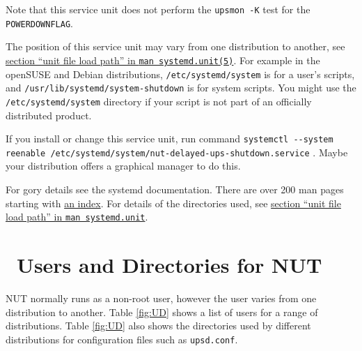 \documentclass[12pt]{article}
\newlength{\headersep}\setlength{\headersep}{3mm}
\newcommand{\Hsep}{\hspace{\headersep}}
\newcommand{\newcolumn}{\vfill\eject}
\newcommand{\upsdconf}{\textcolor{UPSDCOLOUR}{\texttt{upsd.conf}}}
\newcommand{\LINman}[2]{\href{https://man7.org/linux/man-pages/man#2/#1.#2.html}{\texttt{man #1(#2)}}}
\begin{document}
Note that this service unit does not perform the \texttt{upsmon -K}
test for the \texttt{POWERDOWNFLAG}.

The position of this service unit may vary from one distribution to
another, see
\href{https://www.freedesktop.org/software/systemd/man/systemd.unit.html}{section
  ``unit file load path'' in \LINman{systemd.unit}{5}}.  For example
in the openSUSE and Debian distributions,
\texttt{/etc{\allowbreak}/systemd{\allowbreak}/system} is for a user's
scripts, and
\texttt{/usr{\allowbreak}/lib{\allowbreak}/systemd{\allowbreak}/system-shutdown}
is for system scripts.  You might use the
\texttt{/etc{\allowbreak}/systemd{\allowbreak}/system} directory if
your script is not part of an officially distributed product.

If you install or change this service unit, run command \texttt{systemctl
  -\/-system reenable
  /etc/{\allowbreak}systemd/{\allowbreak}system/{\allowbreak}nut-delayed-ups-shutdown{\allowbreak}.service} .
Maybe your distribution offers a graphical manager to do this.

For gory details see the systemd documentation.  There are over 200 man pages
starting with \href{https://www.freedesktop.org/software/systemd/man/}{an
  index}.  For details of the directories used, see 
\href{https://www.freedesktop.org/software/systemd/man/systemd.unit.html}{section
  ``unit file load path'' in \texttt{man systemd.unit}}.






\section{\Hsep\ Users and Directories for NUT}\label{section:UD}

NUT normally runs as a non-root user, however the user varies from one
distribution to another.  Table \ref{fig:UD} shows a list of users for
a range of distributions.  Table \ref{fig:UD} also shows the
directories used by different distributions for configuration files
such as \upsdconf.
\end{document}
